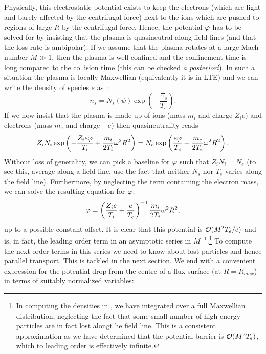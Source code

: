 \documentclass{revtex4-2}
\begin{document}
Physically, this electrostatic potential exists to keep the electrons (which are light and barely affected by the centrifugal force) next to the ions which are pushed to regions of large $R$ by the centrifugal force.
Hence, the potential $\varphi$ has to be solved for by insisting that the plasma is quasineutral along field lines (and that the loss rate is ambipolar).
If we assume that the plasma rotates at a large Mach number $M \gg 1$, then the plasma is well-confined and the confinement time is long compared to the collision time (this can be checked \textit{a posteriori}). In such a situation the plasma is locally Maxwellian (equivalently it is in LTE) and we can write the density of species $s$ as~\cite{catto:2784,flowtome1}:
\begin{equation}
n_s = N_s(\psi) \exp\left( - \frac{\Xi_s}{T_s} \right).
\label{confinedDensity}
\end{equation}
If we now insist that the plasma is made up of ions (mass $m_i$ and charge $Z_i e$) and electrons (mass $m_e$ and charge $-e$) then quasineutrality reads
\begin{equation}
Z_i N_i \exp\left( - \frac{Z_i e\varphi}{T_i} + \frac{m_i}{2T_i} \omega^2 R^2 \right) = N_e \exp\left( \frac{e\varphi}{T_e} + \frac{m_e}{2T_e} \omega^2 R^2 \right).
\end{equation}
Without loss of generality, we can pick a baseline for $\varphi$ such that $Z_i N_i = N_e$ (to see this, average along a field line, use the fact that neither $N_s$ nor $T_s$ varies along the field line). Furthermore, by neglecting the term containing the electron mass, we can solve the resulting equation for $\varphi$:
\begin{equation}
\varphi = \left( \frac{Z_i e}{T_i} + \frac{e}{T_e}\right)^{-1} \frac{m_i}{2 T_i} \omega^2 R^2,
\end{equation}
up to a possible constant offset. It is clear that this potential is $\mathcal{O}(M^2T_e/e)$ and is, in fact, the leading order term in an asymptotic series in $M^{-1}$.\footnote{In computing the densities in , we have integrated over a full Maxwellian distribution, neglecting the fact that some small number of high-energy particles are in fact lost alongt he field line. This is a consistent approximation as we have determined that the potential barrier is $\mathcal{O}(M^2T_e)$, which to leading order is effectively infinite.} 
To compute the next-order terms in this series we need to know about lost particles and hence parallel transport. This is tackled in the next section. We end with a convenient expression for the potential drop from the centre of a flux surface (at $R = R_{max}$) in terms of suitably normalized variables:
\end{document}
